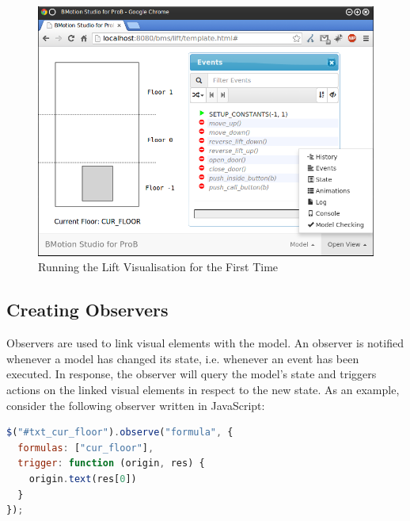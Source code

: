 \begin{figure}[!ht]
\begin{center}
	\includegraphics[width=12cm]{img/tutorial/tut_03.png}
	\caption{Running the Lift Visualisation for the First Time}
	\label{fig_tut_03_running1}
\end{center}
\end{figure}

\subsection{Creating Observers}
\label{sec_creation_observers}

Observers are used to link visual elements with the model. 
An observer is notified whenever a model has changed its state, i.e. whenever an event has been executed. 
In response, the observer will query the model's state and triggers actions on the linked visual elements in respect to the new state.
As an example, consider the following observer written in JavaScript:

\begin{lstlisting}[language=JavaScript, caption={Formula Observer Displaying the Current Floor (JavaScript)}]
$("#txt_cur_floor").observe("formula", {
  formulas: ["cur_floor"],
  trigger: function (origin, res) {
    origin.text(res[0])
  }
});
\end{lstlisting}

